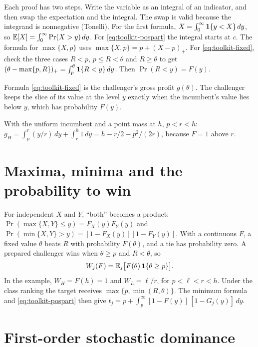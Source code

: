 Each proof has two steps. Write the variable as an integral of an indicator, and then swap the expectation and the
integral. The swap is valid because the integrand is nonnegative (Tonelli). For the first formula,
\(X=\int_0^\infty\mathbf{1}\{y<X\}\,dy\), so \(\mathbb{E}[X]=\int_0^\infty\Pr(X>y)\,dy\).
For \eqref{eq:toolkit-pospart} the integral starts at \(c\). The formula for \(\max\{X,p\}\) uses
\(\max\{X,p\}=p+(X-p)_+\). For \eqref{eq:toolkit-fixed}, check the three cases \(R<p\), \(p\le R<\theta\) and
\(R\ge\theta\) to get \((\theta-\max\{p,R\})_+=\int_p^\theta\mathbf{1}\{R<y\}\,dy\). Then \(\Pr(R<y)=F(y)\).

Formula \eqref{eq:toolkit-fixed} is the challenger's gross profit \(g(\theta)\). The challenger keeps the slice of its value at the level \(y\) exactly when the incumbent's value lies below \(y\), which has probability \(F(y)\).

With the uniform incumbent and a point mass at \(h\), \(p<r<h\):
\(g_H=\int_p^r(y/r)\,dy+\int_r^h1\,dy=h-r/2-p^2/(2r)\), because \(F=1\) above \(r\).

\section{Maxima, minima and the probability to win}\label{sec:toolkit-maxmin}

For independent \(X\) and \(Y\), ``both'' becomes a product: \(\Pr(\max\{X,Y\}\le y)=F_X(y)F_Y(y)\) and \(\Pr(\min\{X,Y\}>y)=[1-F_X(y)][1-F_Y(y)]\).
With a continuous \(F\), a fixed value \(\theta\) beats \(R\) with probability \(F(\theta)\), and a tie has probability
zero. A prepared challenger wins when \(\theta\ge p\) and \(R<\theta\), so
\begin{equation}\label{eq:toolkit-win}
W_j(F)=\mathbb{E}_j\bigl[F(\theta)\,\mathbf{1}\{\theta\ge p\}\bigr].
\end{equation}
In the example, \(W_H=F(h)=1\) and \(W_L=\ell/r\), for \(p<\ell<r<h\). Under the class ranking the target receives
\(\max\{p,\min(R,\theta)\}\). The minimum formula and \eqref{eq:toolkit-pospart} then give \(t_j=p+\int_p^\infty[1-F(y)]\,[1-G_j(y)]\,dy\).

\section{First-order stochastic dominance}\label{sec:toolkit-fosd}


